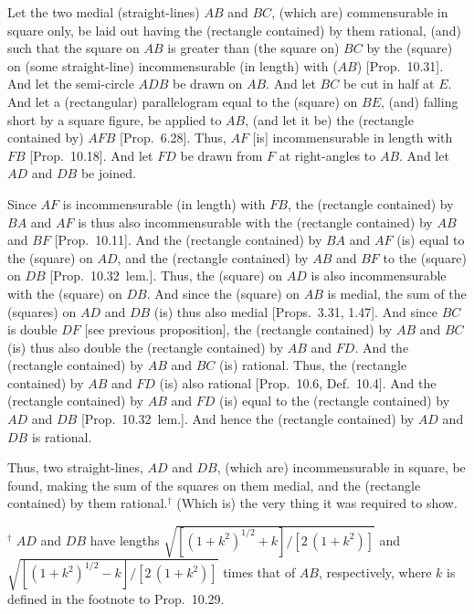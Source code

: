 \begin{Parallel}{}{}
{
\centerline{}

Let the two medial (straight-lines) $AB$ and $BC$,
(which are) commensurable in square only, be laid out having the
(rectangle contained) by them rational, (and) such that the square on
$AB$ is greater than (the square on) $BC$ by the (square) on (some straight-line)
incommensurable (in length) with ($AB$) [Prop.~10.31].
And let the semi-circle $ADB$ be drawn on $AB$.
And let $BC$ be cut in half at $E$. And let a (rectangular) parallelogram
equal to the (square) on $BE$, (and) falling short by a square figure,
be applied to $AB$, (and let it be) the (rectangle
contained by) $AFB$ [Prop.~6.28].
Thus, $AF$ [is] incommensurable in length with $FB$
[Prop.~10.18]. And let 
$FD$ be drawn from $F$ at right-angles to $AB$.
And let $AD$ and $DB$ be joined.

Since $AF$ is incommensurable (in length) with $FB$, the (rectangle contained) by
$BA$ and $AF$ is thus also incommensurable with the (rectangle contained)
by $AB$ and $BF$ [Prop.~10.11].  And the
(rectangle contained) by $BA$ and $AF$ (is) equal to the (square) on $AD$, and the (rectangle contained) by $AB$ and $BF$ to the (square) on $DB$
[Prop.~10.32~lem.]. Thus, the (square) on
$AD$ is also incommensurable with the (square) on $DB$. And
since the (square) on $AB$ is medial, the sum of the (squares) on
$AD$ and $DB$ (is) thus also medial [Props.~3.31, 1.47]. And since $BC$ is double $DF$ [see previous proposition], the (rectangle
contained) by $AB$ and $BC$ (is) thus also double the (rectangle contained)
by $AB$ and $FD$. And the (rectangle contained) by $AB$ and $BC$ (is)
rational. Thus, the (rectangle contained) by $AB$ and $FD$
(is) also rational [Prop.~10.6, Def.~10.4]. And the (rectangle contained) by
$AB$ and $FD$ (is) equal to the (rectangle contained) by $AD$ and $DB$
[Prop.~10.32~lem.]. And hence the (rectangle
contained) by $AD$ and $DB$ is rational.

Thus, two straight-lines, $AD$ and $DB$, (which are) incommensurable
in square, be found, making the sum of the squares on them medial,
and the (rectangle contained) by them rational.$^\dag$
(Which is) the very thing
it was required to show.}
\end{Parallel}
{\footnotesize\noindent$^\dag$ $AD$ and $DB$ have lengths $\sqrt{[(1+k^2)^{1/2}+k]/[2\,(1+k^2)]}$
and  $\sqrt{[(1+k^2)^{1/2}-k]/[2\,(1+k^2)]}$ times that of $AB$, respectively, where $k$ is defined in the footnote
to Prop.~10.29.}

